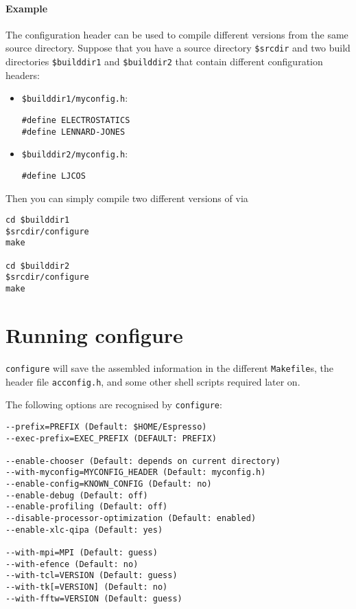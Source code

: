 \paragraph{Example}
The configuration header can be used to compile different versions
from the same source directory. Suppose that you have a source
directory \texttt{\$srcdir} and two build directories
\texttt{\$builddir1} and \texttt{\$builddir2} that contain different
configuration headers:

\begin{itemize}
\item \texttt{\$builddir1/myconfig.h}:
\begin{verbatim}
#define ELECTROSTATICS
#define LENNARD-JONES
\end{verbatim}

\item \texttt{\$builddir2/myconfig.h}:
\begin{verbatim}
#define LJCOS
\end{verbatim}
\end{itemize}

\noindent Then you can simply compile two different versions of \es{} via
\begin{verbatim}
cd $builddir1
$srcdir/configure
make

cd $builddir2
$srcdir/configure
make
\end{verbatim}

\section{Running configure}
\label{sec:configure}

\texttt{configure} will save the assembled information in the
different \texttt{Makefile}s, the header file \texttt{acconfig.h}, and
some other shell scripts required later on.

The following options are recognised by \texttt{configure}:
\begin{verbatim}
--prefix=PREFIX (Default: $HOME/Espresso)
--exec-prefix=EXEC_PREFIX (DEFAULT: PREFIX)

--enable-chooser (Default: depends on current directory)
--with-myconfig=MYCONFIG_HEADER (Default: myconfig.h)
--enable-config=KNOWN_CONFIG (Default: no)
--enable-debug (Default: off)
--enable-profiling (Default: off)
--disable-processor-optimization (Default: enabled)
--enable-xlc-qipa (Default: yes)

--with-mpi=MPI (Default: guess)
--with-efence (Default: no)
--with-tcl=VERSION (Default: guess)
--with-tk[=VERSION] (Default: no)
--with-fftw=VERSION (Default: guess)
\end{verbatim}

